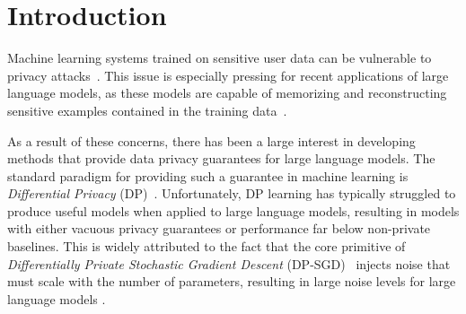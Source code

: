 \section{Introduction}
Machine learning systems trained on sensitive user data can be vulnerable to privacy attacks~\citep{shokri2017membership,hayes2019logan}.
This issue is especially pressing for recent applications of large language models, as these models are capable of memorizing and reconstructing sensitive examples contained in 
the training data~\citep{DBLP:journals/corr/ZhangBHRV16, carlini2020extracting}.

As a result of these concerns, there has been a large interest in developing
methods that provide data privacy guarantees for large language models.
The standard paradigm for providing such a guarantee in machine learning is \textit{Differential Privacy} (DP)~\citep{dwork2006calibrating,dwork2014algorithmic}.
Unfortunately, DP learning has typically struggled to produce useful models when applied to large language models, resulting in models with either vacuous privacy guarantees \citep{dupuy2021efficient} or performance far below non-private baselines.
This is widely attributed to the fact that the core primitive of \textit{Differentially Private Stochastic Gradient Descent} (DP-SGD)~\citep{song2013stochastic,bassily2014differentially,abadi2016deep} injects noise that must scale with the number of parameters, resulting in large noise levels for large language models \citep{yu2021not}.

